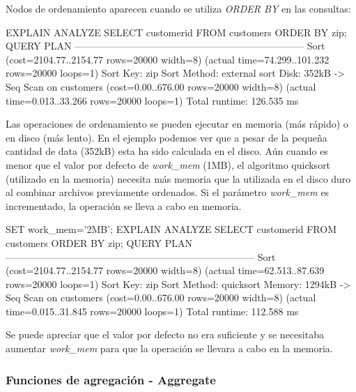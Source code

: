 Nodos de ordenamiento aparecen cuando se utiliza \textit{ORDER BY} en las consultas:\\

\begin{pyglist}
 EXPLAIN ANALYZE SELECT customerid FROM customers ORDER BY zip;
                                    QUERY PLAN                                                     
-----------------------------------------------------------------------
 Sort  (cost=2104.77..2154.77 rows=20000 width=8) 
        (actual time=74.299..101.232 rows=20000 loops=1)
   Sort Key: zip
   Sort Method: external sort  Disk: 352kB
   ->  Seq Scan on customers  (cost=0.00..676.00 rows=20000 width=8)
    (actual time=0.013..33.266 rows=20000 loops=1)
 Total runtime: 126.535 ms
\end{pyglist}

Las operaciones de ordenamiento se pueden ejecutar en memoria (más rápido) o en disco (más lento). En el ejemplo podemos ver que a pesar de la pequeña cantidad de data (352kB) esta ha sido calculada en el disco. Aún cuando es menor que el valor por defecto de \textit{work\_mem} (1MB), el algoritmo quicksort (utilizado en la memoria) necesita más memoria que la utilizada en el disco duro al combinar archivos previamente ordenados. Si el parámetro \textit{work\_mem} es incrementado, la operación se lleva a cabo en memoria. \cite{GregorySmith2010}\\

\begin{pyglist}
SET work_mem='2MB';
EXPLAIN ANALYZE SELECT customerid FROM customers ORDER BY zip;
                                   QUERY PLAN                                                     
-----------------------------------------------------------------------------
 Sort  (cost=2104.77..2154.77 rows=20000 width=8)
      (actual time=62.513..87.639 rows=20000 loops=1)
   Sort Key: zip
   Sort Method: quicksort  Memory: 1294kB
   ->  Seq Scan on customers  (cost=0.00..676.00 rows=20000 width=8) 
                     (actual time=0.015..31.845 rows=20000 loops=1)
 Total runtime: 112.588 ms
\end{pyglist}

Se puede apreciar que el valor por defecto no era suficiente y se necesitaba aumentar \textit{work\_mem} para que la operación se llevara a cabo en la memoria.\\

\subsubsection{Funciones de agregación - Aggregate}

